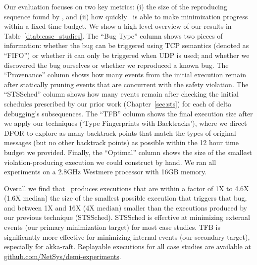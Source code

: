 
Our evaluation focuses on two key metrics: (i) the size of
the reproducing sequence found by \sys, and (ii) how quickly
\sys~is able to make minimization progress within a fixed time
budget. We show a high-level overview
of our results in Table~\ref{dtab:case_studies}.
The ``Bug Type'' column shows two pieces of information: whether the bug can be
triggered using TCP semantics (denoted as ``FIFO'')
or whether it can only be triggered when UDP is used; and whether we discovered
the bug ourselves or whether we
reproduced a known bug. The ``Provenance'' column shows how many events from the initial execution
remain after statically pruning events
that are concurrent with the safety violation.
The ``STSSched'' column shows how many events remain after checking the initial schedules
prescribed by our prior work (Chapter~\ref{sec:sts}) for each of delta debugging's
subsequences. The ``TFB'' column shows the final execution size after
we apply our techniques (`Type Fingerprints with Backtracks'), where we direct
DPOR to explore as many backtrack points that match the types of original
messages (but no other
backtrack points) as possible within the 12 hour time budget we provided.
Finally, the ``Optimal'' column shows the size of the smallest
violation-producing execution we could construct by hand.
We ran all experiments on a 2.8GHz Westmere processor with 16GB memory.

Overall we find
that \sys~produces executions that are within
a factor of 1X to 4.6X (1.6X median) the size of the smallest possible execution
that triggers that bug, and between 1X and 16X (4X median) smaller than the
executions produced by our previous technique (STSSched).
STSSched is effective at minimizing external events (our primary minimization
target) for most case studies. TFB is
significantly more effective for minimizing internal events (our secondary
target), especially for akka-raft.
Replayable executions for all case studies are available at
\href{https://github.com/NetSys/demi-experiments}{github.com/NetSys/demi-experiments}.


